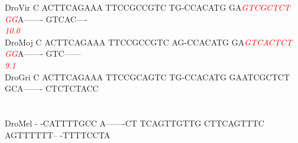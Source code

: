 \documentclass[11pt,twoside,reqno,a4paper]{article}
\begin{document}
{DroVir	C	ACTTCAGAAA	TTCCGCCGTC	TG-CCACATG	GA\textit{\textcolor{Red}{G}}\textit{\textcolor{Red}{T}}\textit{\textcolor{Red}{C}}\textit{\textcolor{Red}{G}}\textit{\textcolor{Red}{C}}\textit{\textcolor{Red}{T}}\textit{\textcolor{Red}{C}}\textit{\textcolor{Red}{T}}	\textit{\textcolor{Red}{G}}\textit{\textcolor{Red}{G}}A-------	GTCAC----\\
\hspace*{7\charwidth}\hspace*{1\charwidth}\hspace*{1\charwidth}\hspace*{1\charwidth}\hspace*{1\charwidth}\hspace*{33\charwidth}\textit{\textcolor{Red}{10.0}}\hspace*{1\charwidth}\hspace*{1\charwidth}\\
DroMoj	C	ACTTCAGAAA	TTCCGCCGTC	AG-CCACATG	GA\textit{\textcolor{Red}{G}}\textit{\textcolor{Red}{T}}\textit{\textcolor{Red}{C}}\textit{\textcolor{Red}{A}}\textit{\textcolor{Red}{C}}\textit{\textcolor{Red}{T}}\textit{\textcolor{Red}{C}}\textit{\textcolor{Red}{T}}	\textit{\textcolor{Red}{G}}\textit{\textcolor{Red}{G}}A-------	GTC------\\
\hspace*{7\charwidth}\hspace*{1\charwidth}\hspace*{1\charwidth}\hspace*{1\charwidth}\hspace*{1\charwidth}\hspace*{33\charwidth}\textit{\textcolor{Red}{9.1}}\hspace*{1\charwidth}\hspace*{1\charwidth}\\
DroGri	C	ACTTCAGAAA	TTCCGCAGTC	TG-CCACATG	GAATCGCTCT	GCA-------	CTCTCTACC\\
\hspace*{7\charwidth}\hspace*{1\charwidth}\hspace*{1\charwidth}\hspace*{1\charwidth}\hspace*{1\charwidth}\hspace*{1\charwidth}\hspace*{1\charwidth}\\
\\
DroMel	-	-CATTTTGCC	A-------CT	TCAGTTGTTG	CTTCAGTTTC	AGTTTTTT--	-TTTTCCTA\\
}
\end{document}
